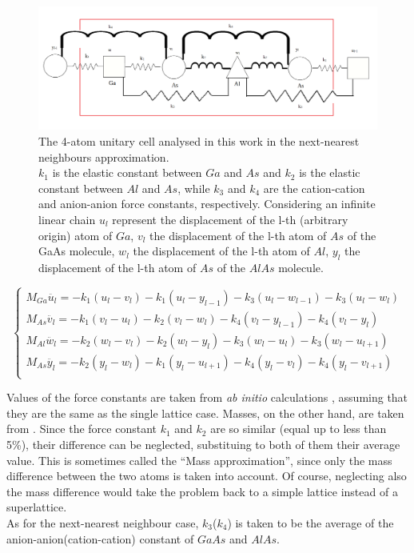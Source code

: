 \documentclass{article}
\begin{document}
\begin{figure}
	\centering
	\includegraphics[width=0.7\linewidth]{cella2.png}
	\caption{The 4-atom unitary cell analysed in this work in the next-nearest neighbours approximation.\\
	$k_1$ is the elastic constant between $Ga$ and $As$ and $k_2$ is the elastic constant between $Al$ and $As$, while $k_3$ and $k_4$ are the cation-cation and anion-anion force constants, respectively. Considering an infinite linear chain $u_l$ represent the displacement of the l-th (arbitrary origin) atom of $Ga$, $v_l$ the displacement of the l-th atom of $As$ of the GaAs molecule, $w_l$ the displacement of the l-th atom of $Al$, $y_l$ the displacement of the l-th atom of $As$ of the $AlAs$ molecule.   }
	\label{fig:cella2}
\end{figure}
\begin{equation}
	\begin{cases}
		M_{Ga}\ddot{u_l} = -k_1(u_l-v_l) - k_1(u_l-y_{l-1}) - k_3(u_l -w_{l-1}) - k_3(u_l - w_{l})	 \\
		M_{As}\ddot{v_l} = -k_1(v_l-u_l) - k_2(v_l-w_l)	- k_4(v_l -y_{l-1}) - k_4(v_l - y_{l})	 	 \\
		M_{Al}\ddot{w_l} = -k_2(w_l-v_l) - k_2(w_l-y_l)	- k_3(w_l - u_l) - k_3(w_l - u_{l+1})	 	 \\
		M_{As}\ddot{y_l} = -k_2(y_l-w_l) - k_1(y_l-u_{l+1})- k_4(y_l -v_l) - k_4(y_l - v_{l+1})	  \\
	\end{cases}
	\label{eq:sistema}	
\end{equation}

Values of the force constants are taken from \emph{ab initio} calculations \cite[Table 2b]{Molinari}, assuming that they are the same as the single lattice case. Masses, on the other hand, are taken from \cite{IUPAC}.
Since the force constant $k_1$ and $k_2$ are so similar (equal up to less than 5\%), their difference can be neglected, substituing to both of them their average value. This is sometimes called the “Mass approximation”, since only the mass difference between the two atoms is taken into account. Of course, neglecting also the mass difference would take the problem back to a simple lattice instead of a superlattice.\\
As for the next-nearest neighbour case, $k_3$($k_4$) is taken to be the average of the anion-anion(cation-cation) constant of $GaAs$ and $AlAs$.
\end{document}
